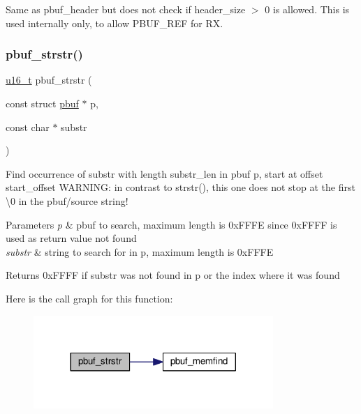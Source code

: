 Same as pbuf\+\_\+header but does not check if \textquotesingle{}header\+\_\+size $>$ 0\textquotesingle{} is allowed. This is used internally only, to allow P\+B\+U\+F\+\_\+\+R\+EF for RX. \mbox{\label{openmote-cc2538_2lwip_2src_2include_2lwip_2pbuf_8h_a9ba3f7b705309ceadb147692fd5a1c7d}} 
\subsubsection{\texorpdfstring{pbuf\+\_\+strstr()}{pbuf\_strstr()}}
{\footnotesize\ttfamily \hyperlink{group__compiler__abstraction_ga77570ac4fcab86864fa1916e55676da2}{u16\+\_\+t} pbuf\+\_\+strstr (\begin{DoxyParamCaption}\item[{const struct \hyperlink{structpbuf}{pbuf} $\ast$}]{p,  }\item[{const char $\ast$}]{substr }\end{DoxyParamCaption})}

Find occurrence of substr with length substr\+\_\+len in pbuf p, start at offset start\+\_\+offset W\+A\+R\+N\+I\+NG\+: in contrast to strstr(), this one does not stop at the first \textbackslash{}0 in the pbuf/source string!


\begin{DoxyParams}{Parameters}
{\em p} & pbuf to search, maximum length is 0x\+F\+F\+FE since 0x\+F\+F\+FF is used as return value \textquotesingle{}not found\textquotesingle{} \\
\hline
{\em substr} & string to search for in p, maximum length is 0x\+F\+F\+FE \\
\hline
\end{DoxyParams}
\begin{DoxyReturn}{Returns}
0x\+F\+F\+FF if substr was not found in p or the index where it was found 
\end{DoxyReturn}
Here is the call graph for this function\+:
\nopagebreak
\begin{figure}[H]
\begin{center}
\leavevmode
\includegraphics[width=257pt]{openmote-cc2538_2lwip_2src_2include_2lwip_2pbuf_8h_a9ba3f7b705309ceadb147692fd5a1c7d_cgraph}
\end{center}
\end{figure}
